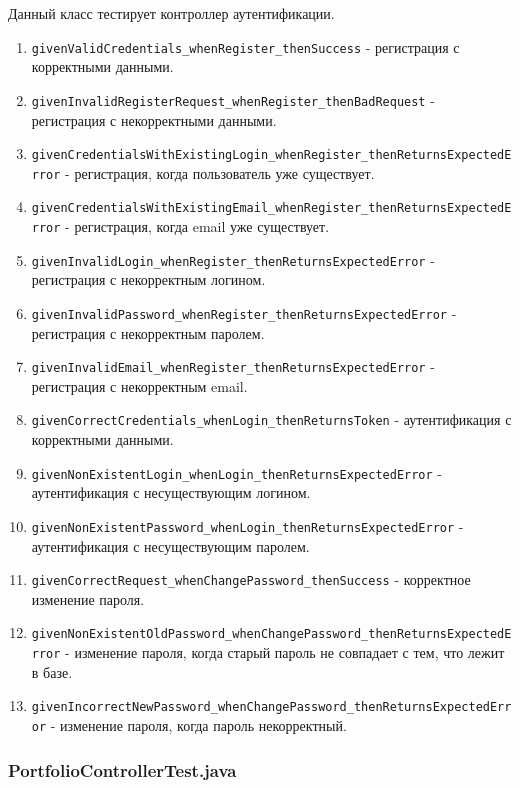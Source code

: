 \documentclass[a4paper, 14pt]{article}
\begin{document}
Данный класс тестирует контроллер аутентификации.

\begin{enumerate}
    \item \texttt{givenValidCredentials\_whenRegister\_thenSuccess} - регистрация с корректными данными.
    \item \texttt{givenInvalidRegisterRequest\_whenRegister\_thenBadRequest} - регистрация с некорректными данными.
    \item \texttt{givenCredentialsWithExistingLogin\_whenRegister\_thenReturnsExpectedError} - регистрация, когда пользователь уже существует.
    \item \texttt{givenCredentialsWithExistingEmail\_whenRegister\_thenReturnsExpectedError} - регистрация, когда email уже существует.
    \item \texttt{givenInvalidLogin\_whenRegister\_thenReturnsExpectedError} - регистрация с некорректным логином.
    \item \texttt{givenInvalidPassword\_whenRegister\_thenReturnsExpectedError} - регистрация с некорректным паролем.
    \item \texttt{givenInvalidEmail\_whenRegister\_thenReturnsExpectedError} - регистрация с некорректным email.
    \item \texttt{givenCorrectCredentials\_whenLogin\_thenReturnsToken} - аутентификация с корректными данными.
    \item \texttt{givenNonExistentLogin\_whenLogin\_thenReturnsExpectedError} - аутентификация с несуществующим логином.
    \item \texttt{givenNonExistentPassword\_whenLogin\_thenReturnsExpectedError} - аутентификация с несуществующим паролем.
    \item \texttt{givenCorrectRequest\_whenChangePassword\_thenSuccess} - корректное изменение пароля.
    \item \texttt{givenNonExistentOldPassword\_whenChangePassword\_thenReturnsExpectedError} - изменение пароля, когда старый пароль не совпадает с тем, что лежит в базе.
    \item \texttt{givenIncorrectNewPassword\_whenChangePassword\_thenReturnsExpectedError} - изменение пароля, когда пароль некорректный.
\end{enumerate}

\subsubsection{PortfolioControllerTest.java}
\end{document}
